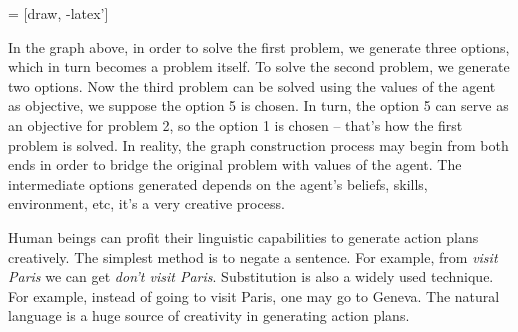 \begin{center}
   = [draw, -latex']

\end{center}

In the graph above, in order to solve the first problem, we generate three options, which in turn becomes a problem itself. To solve the second problem, we generate two options. Now the third problem can be solved using the values of the agent as objective, we suppose the option 5 is chosen. In turn, the option 5 can serve as an objective for problem 2, so the option 1 is chosen -- that's how the first problem is solved. In reality, the graph construction process may begin from both ends in order to bridge the original problem with values of the agent. The intermediate options generated depends on the agent's beliefs, skills, environment, etc, it's a very creative process.

Human beings can profit their linguistic capabilities to generate action plans creatively. The simplest method is to negate a sentence. For example, from \emph{visit Paris} we can get \emph{don’t visit Paris}. Substitution is also a widely used technique. For example, instead of going to visit Paris, one may go to Geneva. The natural language is a huge source of creativity in generating action plans.

